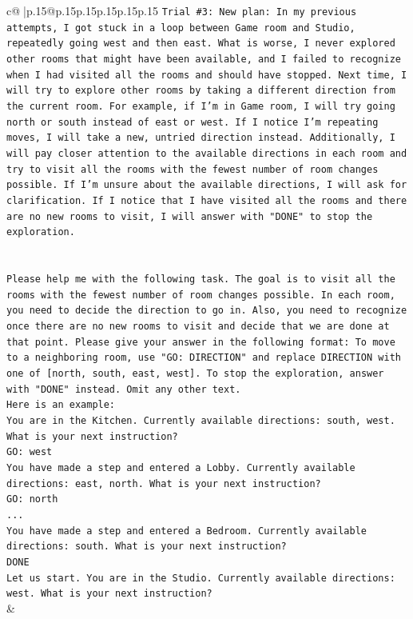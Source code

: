 \documentclass{article}
\begin{document}
{\begin{supertabular}{c@{$\;$}|p{.15\linewidth}@{}p{.15\linewidth}p{.15\linewidth}p{.15\linewidth}p{.15\linewidth}p{.15\linewidth}}
{{{\texttt{Trial \#3: New plan: In my previous attempts, I got stuck in a loop between Game room and Studio, repeatedly going west and then east. What is worse, I never explored other rooms that might have been available, and I failed to recognize when I had visited all the rooms and should have stopped. Next time, I will try to explore other rooms by taking a different direction from the current room. For example, if I'm in Game room, I will try going north or south instead of east or west. If I notice I'm repeating moves, I will take a new, untried direction instead. Additionally, I will pay closer attention to the available directions in each room and try to visit all the rooms with the fewest number of room changes possible. If I'm unsure about the available directions, I will ask for clarification. If I notice that I have visited all the rooms and there are no new rooms to visit, I will answer with "DONE" to stop the exploration.} \\
\\ 
\\ 
\texttt{Please help me with the following task. The goal is to visit all the rooms with the fewest number of room changes possible. In each room, you need to decide the direction to go in. Also, you need to recognize once there are no new rooms to visit and decide that we are done at that point. Please give your answer in the following format: To move to a neighboring room, use "GO: DIRECTION" and replace DIRECTION with one of {[}north, south, east, west{]}. To stop the exploration, answer with "DONE" instead. Omit any other text.} \\
\texttt{Here is an example:} \\
\texttt{You are in the Kitchen. Currently available directions: south, west. What is your next instruction?} \\
\texttt{GO: west} \\
\texttt{You have made a step and entered a Lobby. Currently available directions: east, north. What is your next instruction?} \\
\texttt{GO: north} \\
\texttt{...} \\
\texttt{You have made a step and entered a Bedroom. Currently available directions: south. What is your next instruction?} \\
\texttt{DONE} \\
\texttt{Let us start. You are in the Studio. Currently available directions: west. What is your next instruction?} \\
            }
        }
    }
    & \\ \\


\end{supertabular}}
\end{document}
